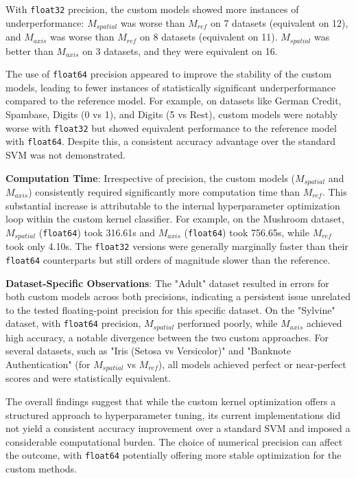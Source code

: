 \documentclass[conference]{IEEEtran}
\begin{document}
With \texttt{float32} precision, the custom models showed more instances of underperformance: $M_{spatial}$ was worse than $M_{ref}$ on 7 datasets (equivalent on 12), and $M_{axis}$ was worse than $M_{ref}$ on 8 datasets (equivalent on 11). $M_{spatial}$ was better than $M_{axis}$ on 3 datasets, and they were equivalent on 16.

The use of \texttt{float64} precision appeared to improve the stability of the custom models, leading to fewer instances of statistically significant underperformance compared to the reference model. For example, on datasets like German Credit, Spambase, Digits (0 vs 1), and Digits (5 vs Rest), custom models were notably worse with \texttt{float32} but showed equivalent performance to the reference model with \texttt{float64}. Despite this, a consistent accuracy advantage over the standard SVM was not demonstrated.

\textbf{Computation Time}:
Irrespective of precision, the custom models ($M_{spatial}$ and $M_{axis}$) consistently required significantly more computation time than $M_{ref}$. This substantial increase is attributable to the internal hyperparameter optimization loop within the custom kernel classifier. For example, on the Mushroom dataset, $M_{spatial}$ (\texttt{float64}) took 316.61s and $M_{axis}$ (\texttt{float64}) took 756.65s, while $M_{ref}$ took only 4.10s. The \texttt{float32} versions were generally marginally faster than their \texttt{float64} counterparts but still orders of magnitude slower than the reference.

\textbf{Dataset-Specific Observations}:
The "Adult" dataset resulted in errors for both custom models across both precisions, indicating a persistent issue unrelated to the tested floating-point precision for this specific dataset. On the "Sylvine" dataset, with \texttt{float64} precision, $M_{spatial}$ performed poorly, while $M_{axis}$ achieved high accuracy, a notable divergence between the two custom approaches. For several datasets, such as "Iris (Setosa vs Versicolor)" and "Banknote Authentication" (for $M_{spatial}$ vs $M_{ref}$), all models achieved perfect or near-perfect scores and were statistically equivalent.

The overall findings suggest that while the custom kernel optimization offers a structured approach to hyperparameter tuning, its current implementations did not yield a consistent accuracy improvement over a standard SVM and imposed a considerable computational burden. The choice of numerical precision can affect the outcome, with \texttt{float64} potentially offering more stable optimization for the custom methods.
\end{document}
